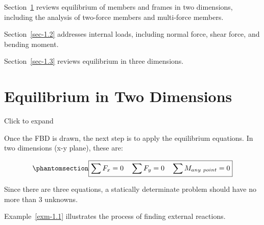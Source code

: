 \documentclass[
  letterpaper,
  DIV=11,
  numbers=noendperiod]{scrreprt}
\theoremstyle{definition}
\theoremstyle{remark}
\begin{document}
Section~\ref{sec-1_1} reviews equilibrium of members and frames in two
dimensions, including the analysis of two-force members and multi-force
members.

Section~\ref{sec-1.2} addresses internal loads, including normal force,
shear force, and bending moment.

Section~\ref{sec-1.3} reviews equilibrium in three dimensions.

\section{Equilibrium in Two Dimensions}\label{sec-1_1}

Click to expand

Once the FBD is drawn, the next step is to apply the equilibrium
equations. In two dimensions (x-y plane), these are:

\begin{equation}\phantomsection\label{eq-1.1}{
\boxed{\sum F_x=0 \quad \sum F_y=0 \quad \sum M_{any~point}=0}
}\end{equation}

Since there are three equations, a statically determinate problem should
have no more than 3 unknowns.

Example~\ref{exm-1.1} illustrates the process of finding external
reactions.
\end{document}
